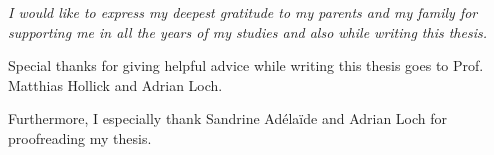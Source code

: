 
\bigskip

\begingroup
\let\clearpage\relax
\let\cleardoublepage\relax
\let\cleardoublepage\relax

{\slshape 
I would like to express my deepest gratitude to my parents and my family for supporting me in all the years of my studies and also while writing this thesis.

\bigskip

Special thanks for giving helpful advice while writing this thesis goes to Prof. Matthias Hollick and Adrian Loch.

\bigskip

Furthermore, I especially thank Sandrine Adéla\"ide and Adrian Loch for proofreading my thesis.
}

\endgroup

